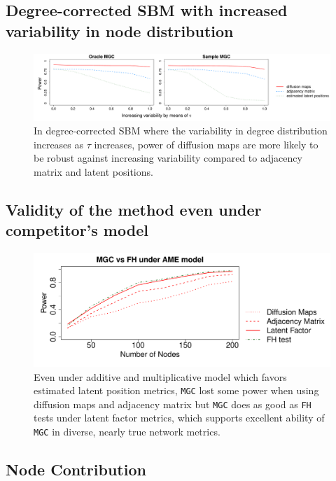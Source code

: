 \documentclass[12pt]{article}
\begin{document}
\subsection*{Degree-corrected SBM with increased variability in node distribution}	

\begin{figure}[H]
	\centering
	\includegraphics[width=6in]{../Figure/powerplot_var.pdf}
	\caption{In degree-corrected SBM where the variability in degree distribution increases as $\tau$ increases, power of diffusion maps are more likely to be robust against increasing variability compared to adjacency matrix and latent positions.}
	\label{fig:dcSBM}
\end{figure}	

\subsection*{Validity of the method even under competitor's model}

\begin{figure}[H]
	\centering
	\includegraphics[width=6in]{../Figure/ame_part.pdf}
	\caption{Even under additive and multiplicative model which favors estimated latent position metrics, \texttt{MGC} lost some power when using diffusion maps and adjacency matrix but \texttt{MGC} does as good as \texttt{FH} tests under latent factor metrics, which supports excellent ability of \texttt{MGC} in diverse, nearly true network metrics.}
	\label{fig:ame}
\end{figure}	


\subsection*{Node Contribution}
\end{document}
